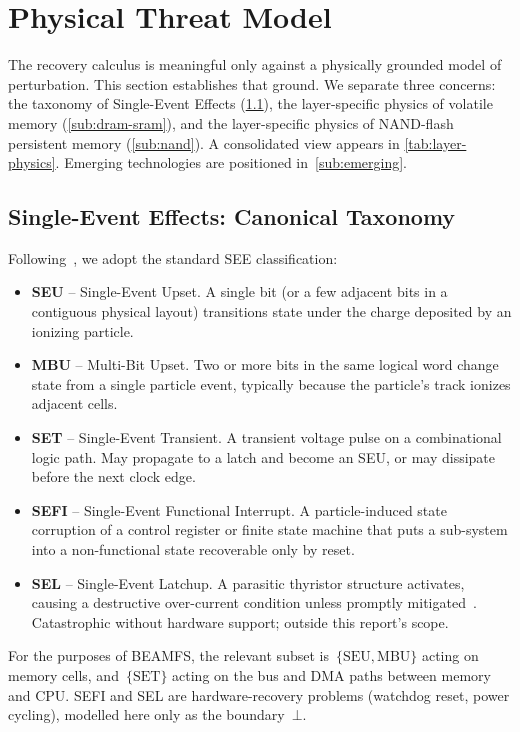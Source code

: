 \section{Physical Threat Model}\label{sec:phys}

The recovery calculus is meaningful only against a physically grounded
model of perturbation. This section establishes that ground.
We separate three concerns: the taxonomy of Single-Event Effects
(\ref{sub:see}), the layer-specific physics of volatile memory
(\ref{sub:dram-sram}), and the layer-specific physics of NAND-flash
persistent memory (\ref{sub:nand}). A consolidated view appears in
\cref{tab:layer-physics}. Emerging technologies are positioned
in~\ref{sub:emerging}.

\subsection{Single-Event Effects: Canonical Taxonomy}\label{sub:see}

Following~\cite{dodd2003,baumann2005,jedec89a}, we adopt the standard
SEE classification:

\begin{itemize}
\item \textbf{SEU} -- Single-Event Upset. A single bit (or a few
  adjacent bits in a contiguous physical layout) transitions
  state under the charge deposited by an ionizing particle.
\item \textbf{MBU} -- Multi-Bit Upset. Two or more bits in the same
  logical word change state from a single particle event,
  typically because the particle's track ionizes adjacent cells.
\item \textbf{SET} -- Single-Event Transient. A transient voltage
  pulse on a combinational logic path. May propagate to a latch and
  become an SEU, or may dissipate before the next clock edge.
\item \textbf{SEFI} -- Single-Event Functional Interrupt. A
  particle-induced state corruption of a control register or finite
  state machine that puts a sub-system into a non-functional state
  recoverable only by reset.
\item \textbf{SEL} -- Single-Event Latchup. A parasitic thyristor
  structure activates, causing a destructive over-current condition
  unless promptly mitigated~\cite{normand1996}. Catastrophic
  without hardware support; outside this report's scope.
\end{itemize}

For the purposes of BEAMFS, the relevant subset is~\(\{\mathrm{SEU},
\mathrm{MBU}\}\) acting on memory cells, and~\(\{\mathrm{SET}\}\) acting
on the bus and DMA paths between memory and CPU. SEFI and SEL are
hardware-recovery problems (watchdog reset, power cycling), modelled
here only as the boundary~\(\bot\).

